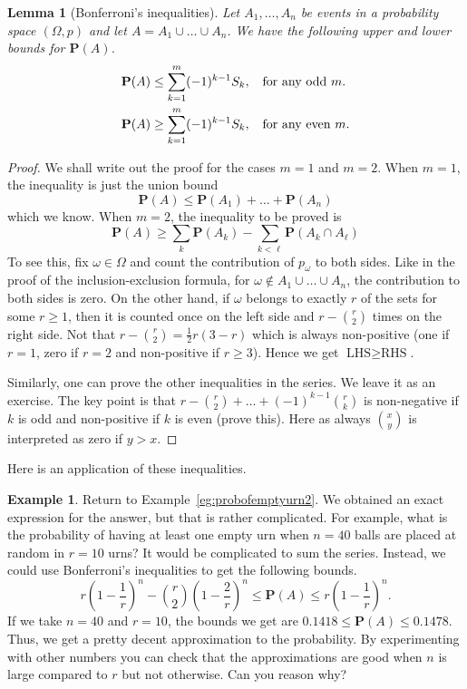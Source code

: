 \documentclass[preprint,  11pt]{amsart}
\theoremstyle{plain} %
\newtheorem{lemma}[theorem]{Lemma}
\theoremstyle{definition} %
\newtheorem{example}[theorem]{Example}
\begin{document}
\begin{lemma}[Bonferroni's inequalities]\label{lem:Bonferroni's inequalities} Let $A_{1},\ldots, A_{n}$ be events in a probability space $(\Omega,p)$ and let $A=A_{1}\cup \ldots \cup A_{n}$. We have the following upper and lower bounds for  $\mathbf{P}(A)$.
\begin{align*}
\mathbf{P}(A) &\le \sum_{k=1}^{m}(-1)^{k-1}S_{k}, \hspace{2mm} \mbox{ for any odd }m. \\
\mathbf{P}(A) &\ge \sum_{k=1}^{m}(-1)^{k-1}S_{k}, \hspace{2mm} \mbox{ for any even }m. 
\end{align*}
\end{lemma}
\begin{proof} We shall write out the proof for the cases $m=1$ and $m=2$. When $m=1$, the inequality is just the union bound
$$
 \mathbf{P}(A)\le \mathbf{P}(A_{1})+\ldots +\mathbf{P}(A_{n})
$$
which we know. When $m=2$, the inequality to be proved is
$$
\mathbf{P}(A)\ge \sum_{k}\mathbf{P}(A_{k})-\sum_{k<\ell}\mathbf{P}(A_{k}\cap A_{\ell})
$$
To see this, fix $\omega\in \Omega$ and count the contribution of $p_{\omega}$ to both sides. Like in the proof of the inclusion-exclusion formula, for $\omega \not\in A_{1}\cup\ldots \cup A_{n}$, the contribution to both sides is zero. On the other hand, if $\omega$ belongs to exactly $r$ of the sets for some $r\ge 1$, then it is counted once on the left side and $r-\binom{r}{2}$ times on the right side. Not that $r-\binom{r}{2} = \frac{1}{2}r(3-r)$ which is always non-positive (one if $r=1$, zero if $r=2$ and non-positive if $r\ge 3$). Hence we get $\mbox{LHS}\ge \mbox{RHS}$.

Similarly, one can prove the other inequalities in the series. We leave it as an exercise. The key point is that $r-\binom{r}{2}+\ldots +(-1)^{k-1}\binom{r}{k}$ is non-negative if $k$ is odd and non-positive if $k$ is even (prove this). Here as always $\binom{x}{y}$ is interpreted as zero if $y>x$.
\end{proof}
Here is an application of these inequalities. 
\begin{example} Return to Example~\ref{eg:probofemptyurn2}. We obtained an exact expression for the answer, but that is rather complicated. For example, what is the probability of having at least one empty urn when $n=40$ balls are placed at random in $r=10$ urns? It would be complicated to sum the series. Instead, we could use Bonferroni's inequalities to get the following bounds.
$$ 
 r\left(1-\frac{1}{r}\right)^{n}-\binom{r}{2}\left(1-\frac{2}{r}\right)^{n}\le \mathbf{P}(A) \le r\left(1-\frac{1}{r}\right)^{n}.
$$
If we take $n=40$ and $r=10$, the bounds we get are $0.1418\le \mathbf{P}(A)\le 0.1478$. Thus, we get a pretty decent approximation to the probability. By experimenting with other numbers you can check that the approximations are good when $n$ is large compared to $r$ but not otherwise. Can you reason why?
\end{example}
\end{document}
